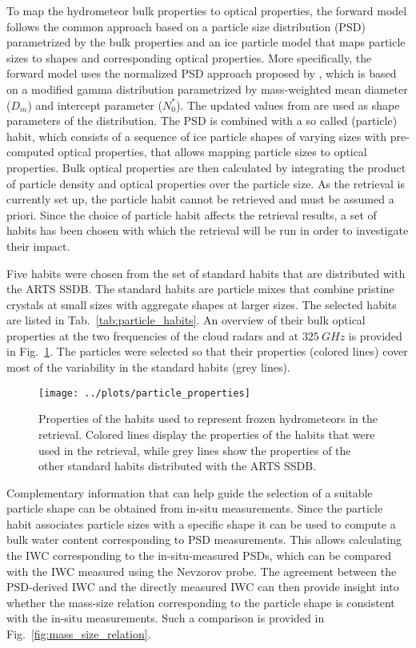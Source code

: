 \documentclass[journal abbreviation, manuscript]{copernicus}
\begin{document}
To map the hydrometeor bulk properties to optical properties, the forward model
follows the common approach based on a particle size distribution (PSD)
parametrized by the bulk properties and an ice particle model that maps particle
sizes to shapes and corresponding optical properties. More specifically, the
forward model uses the normalized PSD approach proposed by \citet{delanoe05},
which is based on a modified gamma distribution parametrized by mass-weighted
mean diameter ($D_m$) and intercept parameter ($N_0^*$). The updated values from
\citet{cazenave19} are used as shape parameters of the distribution. The PSD is
combined with a so called (particle) habit, which consists of a sequence of ice
particle shapes of varying sizes with pre-computed optical properties, that
allows mapping particle sizes to optical properties. Bulk optical properties are
then calculated by integrating the product of particle density and optical
properties over the particle size. As the retrieval is currently set up, the
particle habit cannot be retrieved and must be assumed a priori. Since the
choice of particle habit affects the retrieval results, a set of habits has been
chosen with which the retrieval will be run in order to investigate their
impact.

Five habits were chosen from the set of standard habits that are distributed
with the ARTS SSDB. The standard habits are particle mixes that combine pristine
crystals at small sizes with aggregate shapes at larger sizes. The selected
habits are listed in Tab.~\ref{tab:particle_habits}. An overview of their bulk
optical properties at the two frequencies of the cloud radars and at
$325\ \unit{GHz}$ is provided in Fig.~\ref{fig:particle_properties}. The
particles were selected so that their properties (colored lines) cover most of
the variability in the standard habits (grey lines).

\begin{figure}[hbpt!]
  \centering
  \texttt{[image: ../plots/particle\_properties]}
  \caption{Properties of the habits used to represent frozen hydrometeors
    in the retrieval. Colored lines display the properties of the habits that
    were used in the retrieval, while grey lines show the properties of the
    other standard habits distributed with the ARTS SSDB.
    }
  \label{fig:particle_properties}
\end{figure}

Complementary information that can help guide the selection of a suitable
particle shape can be obtained from in-situ measurements. Since the particle
habit associates particle sizes with a specific shape it can be used to compute
a bulk water content corresponding to PSD measurements. This allows calculating
the IWC corresponding to the in-situ-measured PSDs, which can be compared with
the IWC measured using the Nevzorov probe. The agreement between the PSD-derived
IWC and the directly measured IWC can then provide insight into whether the
mass-size relation corresponding to the particle shape is consistent with the
in-situ measurements. Such a comparison is provided in
Fig.~\ref{fig:mass_size_relation}.
\end{document}

